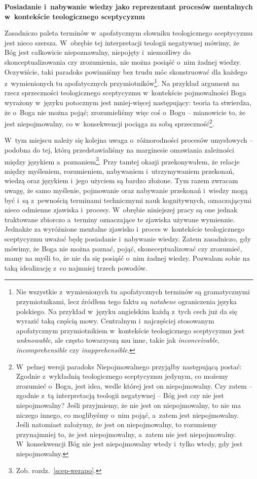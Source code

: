 \textbf{Posiadanie i~nabywanie wiedzy jako reprezentant procesów mentalnych w~kontekście teologicznego sceptycyzmu}

Zasadniczo paleta terminów w~apofatycznym słowniku teologicznego sceptycyzmu jest nieco szersza. W~obrębie tej interpretacji teologii negatywnej mówimy, że Bóg jest całkowicie niepoznawalny, niepojęty i~niemożliwy do skonceptualizowania czy zrozumienia, nie można posiąść o~nim żadnej wiedzy. Oczywiście, taki paradoks powinniśmy bez trudu móc skonstruować dla każdego z~wymienionych tu apofatycznych przymiotników\footnote{Nie wszystkie z~wymienionych tu apofatycznych terminów są gramatycznymi przymiotnikami, lecz źródłem tego faktu są \textit{notabene} ograniczenia języka polskiego. Na przykład w~języku angielskim każdą z~tych cech już da się wyrazić taką częścią mowy. Centralnym i~najczęściej stosowanym apofatycznym przymiotnikiem w~kontekście teologicznego sceptycyzmu jest \textit{unknowable}, ale często towarzyszą mu inne, takie jak \textit{inconceivable}, \textit{incomprehensible} czy \textit{inapprehensible}.}. Na przykład argument na rzecz sprzeczności teologicznego sceptycyzmu w~kontekście pojmowalności Boga wyrażony w~języku potocznym jest mniej-więcej następujący: teoria ta stwierdza, że o~Boga nie można pojąć; zrozumieliśmy więc coś o~Bogu -- mianowicie to, że jest niepojmowalny, co w~konsekwencji pociąga za sobą sprzeczność\footnote{W~pełnej wersji paradoks Niepojmowalnego przyjąłby następującą postać: Zgodnie z~wykładnią teologicznego sceptycyzmu jedynym, co możemy zrozumieć o~Bogu, jest idea, wedle której jest on niepojmowalny. Czy zatem -- zgodnie z~tą interpretacją teologii negatywnej -- Bóg jest czy nie jest niepojmowalny? Jeśli przyjmiemy, że nie jest on niepojmowalny, to nie ma niczego innego, co moglibyśmy o~nim pojąć, a~zatem jest niepojmowalny. Jeśli natomiast założymy, że jest on niepojmowalny, to rozumiemy przynajmniej to, że jest niepojmowalny, a~zatem nie jest niepojmowalny. W~konsekwencji Bóg nie jest niepojmowalny wtedy i~tylko wtedy, gdy jest niepojmowalny.}.

W~tym miejscu należy się kolejna uwaga o~różnorodności procesów umysłowych -- podobna do tej, którą przedstawialiśmy na marginesie omawiania zależności między językiem a~poznaniem\footnote{Zob. rozdz.~\ref{scep-werapo}.}. Przy tamtej okazji przekonywałem, że relacje między myśleniem, rozumieniem, nabywaniem i~utrzymywaniem przekonań, wiedzą oraz językiem i~jego użyciem są bardzo złożone. Tym razem zwracam uwagę, że samo myślenie, pojmowanie oraz nabywanie przekonań i~wiedzy mogą być i~są z~pewnością terminami technicznymi nauk kognitywnych, oznaczającymi nieco odmienne zjawiska i~procesy. W~obrębie niniejszej pracy są one jednak traktowane zbiorczo a~terminy oznaczające te zjawiska używane wymiennie. Jednakże za wyróżnione mentalne zjawisko i~proces w~kontekście teologicznego sceptycyzmu uważać będę posiadanie i~nabywanie wiedzy. Zatem zasadniczo, gdy mówimy, że Boga nie można poznać, pojąć, skoneceptualizować czy zrozumieć, mamy na myśli to, że nie da się posiąść o~nim żadnej wiedzy. Pozwalam sobie na taką idealizację z~co najmniej trzech powodów.

